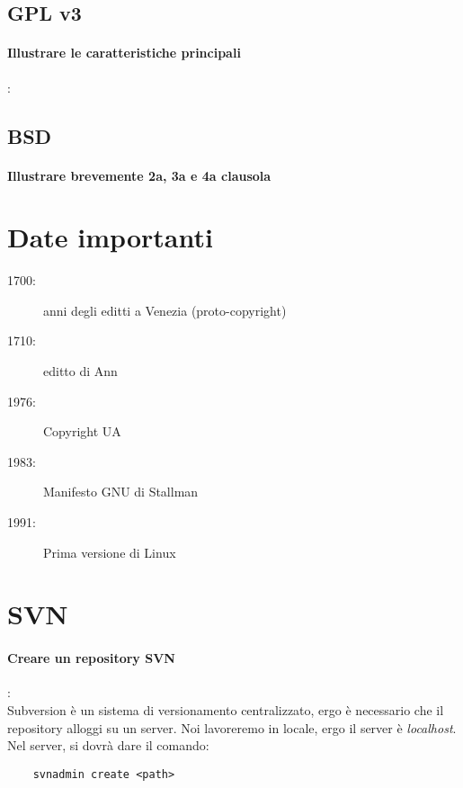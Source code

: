 \documentclass[a4paper]{article}
\begin{document}
	\subsection{GPL v3}
	
	\paragraph{Illustrare le caratteristiche principali}: \\
	\subsection{BSD}
	
	\paragraph{Illustrare brevemente 2a, 3a e 4a clausola}

	\section{Date importanti}
	
	\begin{description}
		\item[1700:] anni degli editti a Venezia (proto-copyright)
		\item[1710:] editto di Ann
		\item[1976:] Copyright UA
		\item[1983:] Manifesto GNU di Stallman
		\item[1991:] Prima versione di Linux
	\end{description}
	
	
	\section{SVN}
	
	\paragraph{Creare un repository SVN}: \\
	Subversion è un sistema di versionamento centralizzato, ergo è necessario che il repository alloggi su un server. Noi lavoreremo in locale, ergo il server è \textit{localhost}.
	Nel server, si dovrà dare il comando:
	\begin{verbatim}
	svnadmin create <path>
	\end{verbatim}
	
\end{document}
